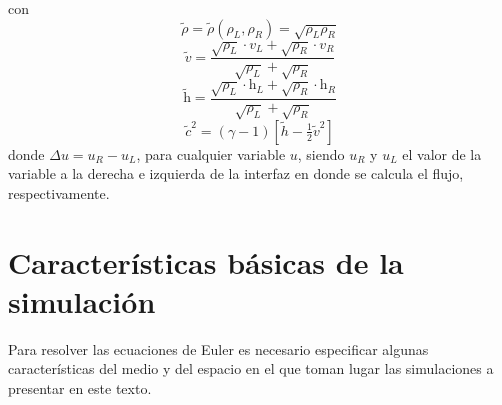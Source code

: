 con
\begin{equation}
	\tilde{\rho} = \tilde{\rho}(\rho_L, \rho_R) = \sqrt{\rho_L \rho_R}
	\label{eq:rho-prom}
\end{equation}
\begin{equation}
	\tilde{v} = \frac{\sqrt{\rho_{L}}\cdot v_L + \sqrt{\rho_{R}}\cdot v_R}{\sqrt{\rho_{L}} + \sqrt{\rho_{R}}}
\end{equation}
\begin{equation}
	\tilde{\mathrm{h}} = \frac{\sqrt{\rho_{L}}\cdot \mathrm{h}_L + \sqrt{\rho_{R}}\cdot \mathrm{h}_R}{\sqrt{\rho_{L}} + \sqrt{\rho_{R}}}
\end{equation}
\begin{equation}
	\tilde{c}^{2} = (\gamma - 1)[\tilde{h} - \tfrac{1}{2}\tilde{v}^2]
	\label{eq:c-prom}
\end{equation}
donde $\Delta u = u_R - u_L$, para cualquier variable $u$, siendo $u_R$ y $u_L$ el valor de la variable a la derecha e izquierda de la interfaz en donde se calcula el flujo, respectivamente.
\section{Características básicas de la simulación}
Para resolver las ecuaciones de Euler es necesario especificar algunas características del medio y  del espacio en el que toman lugar las simulaciones a presentar en este texto. 
